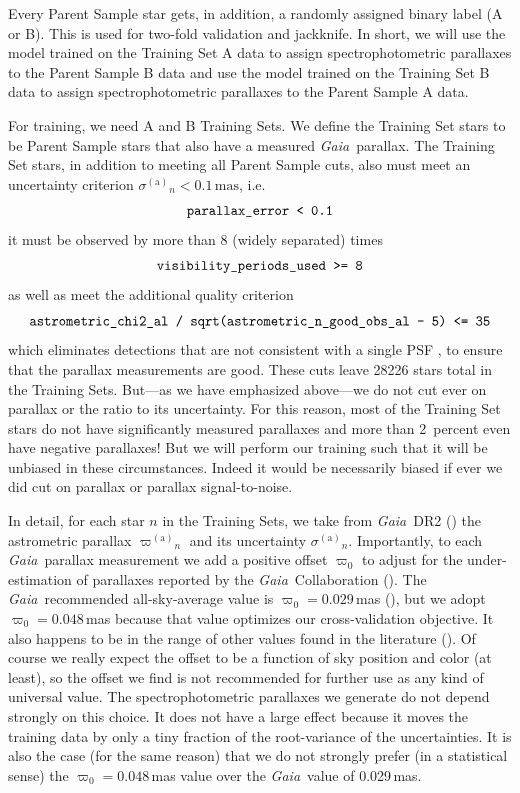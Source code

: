 \documentclass[modern]{aastex62}
\newcommand{\code}[1]{\texttt{\detokenize{#1}}}
\newcommand{\acronym}[1]{{\small{#1}}}
\newcommand{\project}[1]{\textsl{#1}}
\newcommand{\gaia}{\project{Gaia}}
\newcommand{\gparallax}{{\varpi^{(\mathrm{a})}}}
\newcommand{\gsigma}{{\sigma^{(\mathrm{a})}}}
\begin{document}
Every Parent Sample star gets, in addition, a randomly assigned binary
label (A or B).
This is used for two-fold validation and jackknife.
In short, we will
use the model trained on the Training Set A data to assign spectrophotometric parallaxes
to the Parent Sample B data and
use the model trained on the Training Set B data to assign spectrophotometric parallaxes
to the Parent Sample A data.

For training, we need A and B Training Sets.
We define the Training Set stars to be Parent Sample stars that also
have a measured \gaia\ parallax.
The Training Set stars, in addition to meeting all Parent Sample cuts,
also must meet an uncertainty criterion $\gsigma_n < 0.1\,\mathrm{mas}$, i.e. 
\begin{equation}
\code{parallax_error < 0.1}
\end{equation}
it must be observed by more than $8$ (widely separated) times
\begin{equation}
\code{visibility_periods_used >= 8}
\end{equation}
as well as meet the additional quality criterion
\begin{equation}
\code{astrometric_chi2_al / sqrt(astrometric_n_good_obs_al - 5) <= 35}
\end{equation}
which eliminates detections that are not consistent with a single PSF \citep[see][]{calj},
to ensure that the parallax measurements are good.
These cuts leave 28226 stars total in the Training Sets.
But---as we have emphasized above---we do not cut ever on parallax or
the ratio to its uncertainty. For this reason, most of the Training Set stars
do not have significantly measured parallaxes and more than 2~percent even have
negative parallaxes!
But we will perform our training such that it will be unbiased in these
circumstances.
Indeed it would be necessarily biased if ever we did cut on parallax or
parallax signal-to-noise.

In detail,
for each star $n$ in the Training Sets, we take from \gaia\ \acronym{DR2} (\citealt{gaiadr2})
the astrometric parallax $\gparallax_n$ and its uncertainty $\gsigma_n$.
Importantly, to each \gaia\ parallax measurement we add a positive
offset $\varpi_0$ to adjust for the under-estimation of
parallaxes reported by the \gaia\ Collaboration (\citealt{lindegren}).
The \gaia\ recommended all-sky-average value is $\varpi_0=0.029$\,mas (\citealt{lindegren}),
but we adopt $\varpi_0 = 0.048$\,mas because that value
optimizes our cross-validation objective.
It also happens to be in the range of other values found in the literature (\citealt{arenou, zinn}).
Of course we really expect the offset to be a function of sky position and color (at least),
so the offset we find is not recommended for further use as any kind of universal value.
The spectrophotometric parallaxes we generate
do not depend strongly on this choice.
It does not have a large effect because it moves the training data by only a tiny
fraction of the root-variance of the uncertainties.
It is also the case (for the same reason) that we do not strongly prefer (in a statistical sense)
the $\varpi_0 = 0.048$\,mas value over the \gaia\ value of 0.029\,mas.
\end{document}
